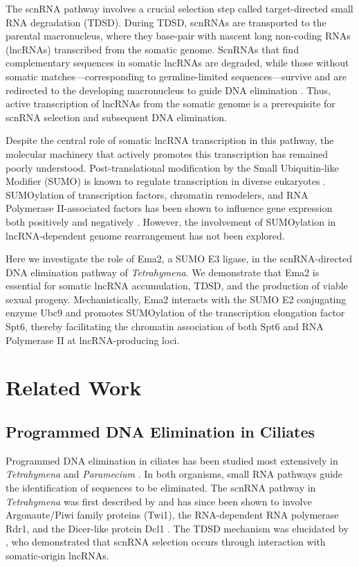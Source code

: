 \documentclass[11pt]{article}
\begin{document}
The scnRNA pathway involves a crucial selection step called target-directed small RNA degradation (TDSD). During TDSD, scnRNAs are transported to the parental macronucleus, where they base-pair with nascent long non-coding RNAs (lncRNAs) transcribed from the somatic genome. ScnRNAs that find complementary sequences in somatic lncRNAs are degraded, while those without somatic matches---corresponding to germline-limited sequences---survive and are redirected to the developing macronucleus to guide DNA elimination \citep{noto2015,mochizuki2012}. Thus, active transcription of lncRNAs from the somatic genome is a prerequisite for scnRNA selection and subsequent DNA elimination.

Despite the central role of somatic lncRNA transcription in this pathway, the molecular machinery that actively promotes this transcription has remained poorly understood. Post-translational modification by the Small Ubiquitin-like Modifier (SUMO) is known to regulate transcription in diverse eukaryotes \citep{gareau2010,hendriks2017}. SUMOylation of transcription factors, chromatin remodelers, and RNA Polymerase II-associated factors has been shown to influence gene expression both positively and negatively \citep{rosonina2017,texari2018}. However, the involvement of SUMOylation in lncRNA-dependent genome rearrangement has not been explored.

Here we investigate the role of Ema2, a SUMO E3 ligase, in the scnRNA-directed DNA elimination pathway of \textit{Tetrahymena}. We demonstrate that Ema2 is essential for somatic lncRNA accumulation, TDSD, and the production of viable sexual progeny. Mechanistically, Ema2 interacts with the SUMO E2 conjugating enzyme Ubc9 and promotes SUMOylation of the transcription elongation factor Spt6, thereby facilitating the chromatin association of both Spt6 and RNA Polymerase II at lncRNA-producing loci.

\section{Related Work}

\subsection{Programmed DNA Elimination in Ciliates}

Programmed DNA elimination in ciliates has been studied most extensively in \textit{Tetrahymena} and \textit{Paramecium} \citep{chalker2011,duharcourt2009}. In both organisms, small RNA pathways guide the identification of sequences to be eliminated. The scnRNA pathway in \textit{Tetrahymena} was first described by \citet{mochizuki2002} and has since been shown to involve Argonaute/Piwi family proteins (Twi1), the RNA-dependent RNA polymerase Rdr1, and the Dicer-like protein Dcl1 \citep{mochizuki2010,aronica2008}. The TDSD mechanism was elucidated by \citet{noto2015}, who demonstrated that scnRNA selection occurs through interaction with somatic-origin lncRNAs.
\end{document}
